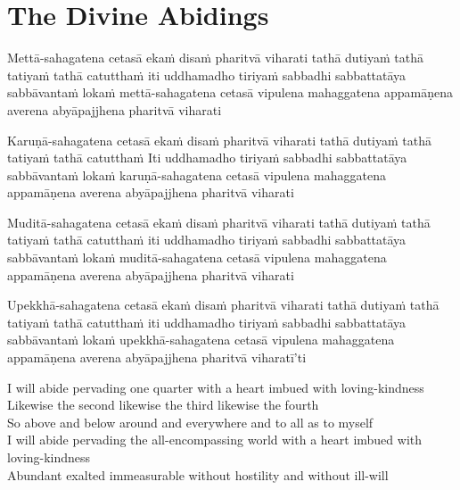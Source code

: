 \suttaRef{[AN 3.65 \& 5.57]}


\section{The Divine Abidings}
\label{divine-abidings}

\begin{leader}
\end{leader}

Mettā-sahagatena cetasā ekaṁ disaṁ pharitvā viharati tathā dutiyaṁ tathā tatiyaṁ tathā catutthaṁ iti uddhamadho tiriyaṁ sabbadhi sabbattatāya sabbāvantaṁ lokaṁ mettā-sahagatena cetasā vipulena mahaggatena appamāṇena averena abyāpajjhena pharitvā viharati

Karuṇā-sahagatena cetasā ekaṁ disaṁ pharitvā viharati tathā dutiyaṁ tathā tatiyaṁ tathā catutthaṁ
Iti uddhamadho tiriyaṁ sabbadhi sabbattatāya sabbāvantaṁ lokaṁ karuṇā-sahagatena cetasā vipulena mahaggatena appamāṇena averena abyāpajjhena pharitvā viharati

Muditā-sahagatena cetasā ekaṁ disaṁ pharitvā viharati tathā dutiyaṁ tathā tatiyaṁ tathā catutthaṁ iti uddhamadho tiriyaṁ sabbadhi sabbattatāya sabbāvantaṁ lokaṁ muditā-sahagatena cetasā vipulena mahaggatena appamāṇena averena abyāpajjhena pharitvā viharati

Upekkhā-sahagatena cetasā ekaṁ disaṁ pharitvā viharati tathā dutiyaṁ tathā tatiyaṁ tathā catutthaṁ iti uddhamadho tiriyaṁ sabbadhi sabbattatāya sabbāvantaṁ lokaṁ upekkhā-sahagatena cetasā vipulena mahaggatena appamāṇena averena abyāpajjhena pharitvā viharatī'ti

\begin{leader}
\end{leader}

I will abide pervading one quarter with a heart imbued with loving-kindness\\
Likewise the second likewise the third likewise the fourth\\
So above and below around and everywhere and to all as to myself\\
I will abide pervading the all-encompassing world with a heart imbued with loving-kindness\\
Abundant exalted immeasurable without hostility and without ill-will

